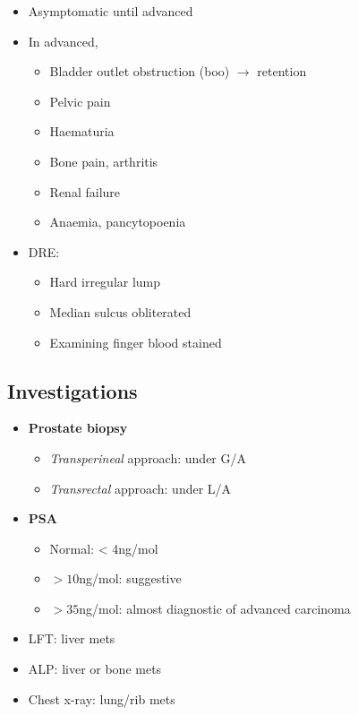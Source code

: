 \documentclass[
  14pt,
]{memoir}
\providecommand{\tightlist}{%
  \setlength{\itemsep}{0pt}\setlength{\parskip}{0pt}}
\begin{document}
\begin{itemize}
\tightlist
\item
  Asymptomatic until advanced
\item
  In advanced,

  \begin{itemize}
  \tightlist
  \item
    Bladder outlet obstruction (boo) \(\rightarrow\) retention
  \item
    Pelvic pain
  \item
    Haematuria
  \item
    Bone pain, arthritis
  \item
    Renal failure
  \item
    Anaemia, pancytopoenia
  \end{itemize}
\item
  DRE:

  \begin{itemize}
  \tightlist
  \item
    Hard irregular lump
  \item
    Median sulcus obliterated
  \item
    Examining finger blood stained
  \end{itemize}
\end{itemize}

\hypertarget{investigations-7}{%
\subsection{Investigations}\label{investigations-7}}

\begin{itemize}
\tightlist
\item
  \textbf{Prostate biopsy}

  \begin{itemize}
  \tightlist
  \item
    \emph{Transperineal} approach: under G/A
  \item
    \emph{Transrectal} approach: under L/A
  \end{itemize}
\item
  \textbf{PSA}

  \begin{itemize}
  \tightlist
  \item
    Normal: \textless{} 4ng/mol
  \item
    \(>10\)ng/mol: suggestive
  \item
    \(>35\)ng/mol: almost diagnostic of advanced carcinoma
  \end{itemize}
\item
  LFT: liver mets
\item
  ALP: liver or bone mets
\item
  Chest x-ray: lung/rib mets
\end{itemize}
\end{document}
